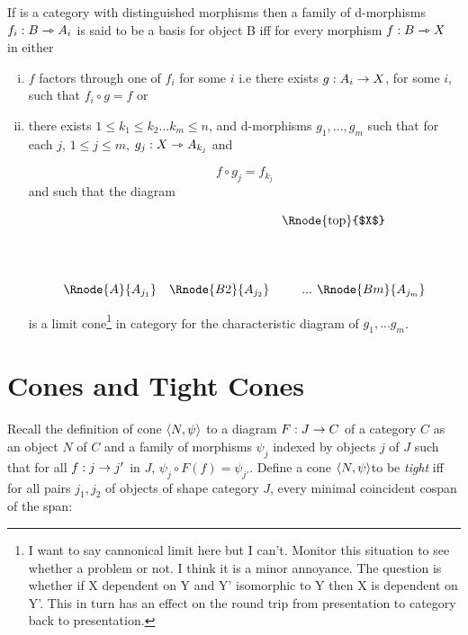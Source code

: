 \documentclass[10pt,a4paper]{scrartcl}
\begin{document}
\begin{definition}
If  is a category with distinguished morphisms then a family of 
d-morphisms  $f_i: B \rightarrowtriangle A_i$ is said to
be a basis for object B iff for every morphism $f: B \rightarrowtriangle X$ in  either 
\begin{enumerate}[(i)]
\item
$f$ factors through one of $f_i$ for some $i$ i.e there exists $g:A_i \rightarrow X$, for some $i$, such that $f_i \circ g = f$ or
\item
there exists $1 \leq k_1 \leq k_2 ... k_m \leq n$, and d-morphisms 
$g_1,...,g_m$ such that for each $j$, $1 \leq j \leq m$, 
$g_j: X \rightarrowtriangle A_{k_j}$ and

$$
f \circ g_j = f_{k_j}
$$
and such that the diagram

\begin{center}
\setlength{\arraycolsep}{0.3cm}
\begin{displaymath}
\begin{array}{ccp{0.2cm}p{0.075cm}c}
&&\Rnode{top}{$X$}& & \\[1.5cm]
\Rnode{A}{A_{j_1}}&\Rnode{B2}{A_{j_2}}&& ... & \Rnode{Bm}{A_{j_m}}\\
\end{array}
\end{displaymath}
\end{center}

is a limit cone\footnote{I want to say cannonical limit here but I can't.
Monitor this situation to see whether a problem or not. I think it is a minor annoyance. The question is whether if X dependent on Y and Y' isomorphic to Y then X is dependent on Y'. This in turn has an effect on the round trip from presentation to category back to presentation. } in category  for the characteristic diagram of $g_1,...g_m$.
\end{enumerate}

\end{definition}

\section{Cones and Tight Cones}
Recall the definition of cone $\left\langle N,\psi\right\rangle$ to a diagram $F:J \rightarrow C$ of a category $C$ as an object $N$ of $C$ and a family of morphisms $\psi_j$ indexed by objects $j$ of $J$ such that for all $f: j \rightarrow j'$ in $J$, $\psi_j \circ F(f) = \psi_{j'}$. Define a cone $\left\langle N,\psi\right\rangle$to be \textit{tight} iff for all pairs $j_1,j_2$ of objects of shape category $J$, every minimal coincident cospan of the span:
\end{document}
